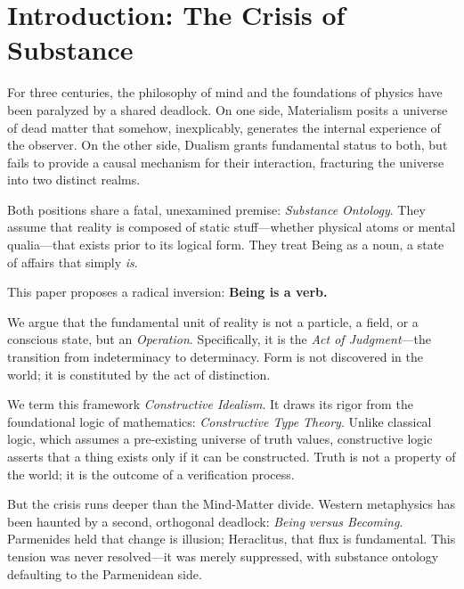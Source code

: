 \documentclass[12pt,a4paper]{article}
\begin{document}
\newpage
\tableofcontents
\newpage

\section{Introduction: The Crisis of Substance}
\label{sec:introduction}

For three centuries, the philosophy of mind and the foundations of physics have been paralyzed
by a shared deadlock. On one side, Materialism posits a universe of dead matter that somehow,
inexplicably, generates the internal experience of the observer. On the other side, Dualism
grants fundamental status to both, but fails to provide a causal mechanism for their interaction,
fracturing the universe into two distinct realms.

Both positions share a fatal, unexamined premise: \emph{Substance Ontology}. They assume that
reality is composed of static stuff---whether physical atoms or mental qualia---that exists prior
to its logical form. They treat Being as a noun, a state of affairs that simply \emph{is}.

This paper proposes a radical inversion: \textbf{Being is a verb.}

We argue that the fundamental unit of reality is not a particle, a field, or a conscious state,
but an \emph{Operation}. Specifically, it is the \emph{Act of Judgment}---the transition from indeterminacy to
determinacy. Form is not discovered in the world; it is constituted by the act of distinction.

We term this framework \emph{Constructive Idealism}. It draws its rigor from the foundational
logic of mathematics: \emph{Constructive Type Theory}. Unlike classical logic, which assumes a pre-existing universe of truth values, constructive logic asserts that a thing exists only if it can be
constructed. Truth is not a property of the world; it is the outcome of a verification process.

But the crisis runs deeper than the Mind-Matter divide. Western metaphysics has been haunted by a second, orthogonal deadlock: \emph{Being versus Becoming}. Parmenides held that change is illusion; Heraclitus, that flux is fundamental. This tension was never resolved---it was merely suppressed, with substance ontology defaulting to the Parmenidean side.
\end{document}
